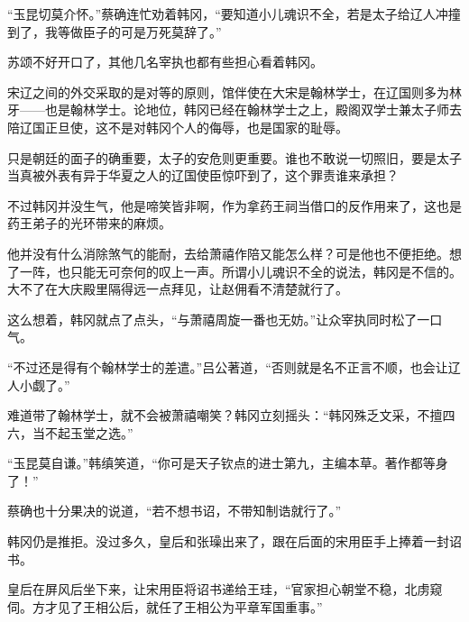 “玉昆切莫介怀。”蔡确连忙劝着韩冈，“要知道小儿魂识不全，若是太子给辽人冲撞到了，我等做臣子的可是万死莫辞了。”

苏颂不好开口了，其他几名宰执也都有些担心看着韩冈。

宋辽之间的外交采取的是对等的原则，馆伴使在大宋是翰林学士，在辽国则多为林牙——也是翰林学士。论地位，韩冈已经在翰林学士之上，殿阁双学士兼太子师去陪辽国正旦使，这不是对韩冈个人的侮辱，也是国家的耻辱。

只是朝廷的面子的确重要，太子的安危则更重要。谁也不敢说一切照旧，要是太子当真被外表有异于华夏之人的辽国使臣惊吓到了，这个罪责谁来承担？

不过韩冈并没生气，他是啼笑皆非啊，作为拿药王祠当借口的反作用来了，这也是药王弟子的光环带来的麻烦。

他并没有什么消除煞气的能耐，去给萧禧作陪又能怎么样？可是他也不便拒绝。想了一阵，也只能无可奈何的叹上一声。所谓小儿魂识不全的说法，韩冈是不信的。大不了在大庆殿里隔得远一点拜见，让赵佣看不清楚就行了。

这么想着，韩冈就点了点头，“与萧禧周旋一番也无妨。”让众宰执同时松了一口气。

“不过还是得有个翰林学士的差遣。”吕公著道，“否则就是名不正言不顺，也会让辽人小觑了。”

难道带了翰林学士，就不会被萧禧嘲笑？韩冈立刻摇头：“韩冈殊乏文采，不擅四六，当不起玉堂之选。”

“玉昆莫自谦。”韩缜笑道，“你可是天子钦点的进士第九，主编本草。著作都等身了！”

蔡确也十分果决的说道，“若不想书诏，不带知制诰就行了。”

韩冈仍是推拒。没过多久，皇后和张璪出来了，跟在后面的宋用臣手上捧着一封诏书。

皇后在屏风后坐下来，让宋用臣将诏书递给王珪，“官家担心朝堂不稳，北虏窥伺。方才见了王相公后，就任了王相公为平章军国重事。”


